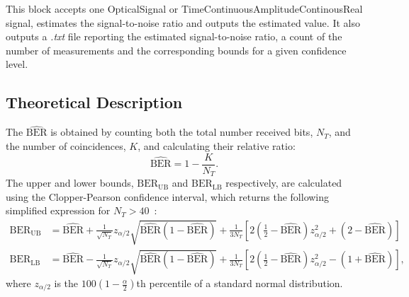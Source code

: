 This block accepts one OpticalSignal or TimeContinuousAmplitudeContinousReal signal, estimates the signal-to-noise ratio and outputs the estimated value. It also outputs a \textit{.txt} file reporting the estimated signal-to-noise ratio, a count of the number of measurements and the corresponding bounds for a given confidence level.

\subsection*{Theoretical Description}\label{bercalc}
The $\widehat{\text{BER}}$ is obtained by counting both the total number received bits, $N_T$, and the number of coincidences, $K$, and calculating their relative ratio:
\begin{equation}
\widehat{\text{BER}}=1-\frac{K}{N_T}.
\end{equation}
The upper and lower bounds, $\text{BER}_\text{UB}$ and $\text{BER}_\text{LB}$ respectively, are calculated using the Clopper-Pearson confidence interval, which returns the following simplified expression for $N_T>40$~\cite{almeida2016continuous}:
\begin{align}
	\text{BER}_\text{UB}&=\widehat{\text{BER}}+\frac{1}{\sqrt{N_T}}z_{\alpha/2}\sqrt{\widehat{\text{BER}}(1-\widehat{\text{BER}})}+\frac{1}{3N_T}\left[2\left(\frac{1}{2}-\widehat{\text{BER}}\right)z_{\alpha/2}^2+(2-\widehat{\text{BER}})\right]\\
	\text{BER}_\text{LB}&=\widehat{\text{BER}}-\frac{1}{\sqrt{N_T}}z_{\alpha/2}\sqrt{\widehat{\text{BER}}(1-\widehat{\text{BER}})}+\frac{1}{3N_T}\left[2\left(\frac{1}{2}-\widehat{\text{BER}}\right)z_{\alpha/2}^2-(1+\widehat{\text{BER}})\right],
\end{align}
where $z_{\alpha/2}$ is the $100\left(1-\frac{\alpha}{2}\right)$th percentile of a standard normal distribution.







 